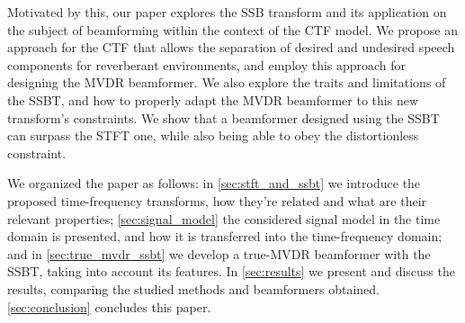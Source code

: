 Motivated by this, our paper explores the SSB transform and its application on the subject of beamforming within the context of the CTF model. We propose an approach for the CTF that allows the separation of desired and undesired speech components for reverberant environments, and employ this approach for designing the MVDR beamformer. We also explore the traits and limitations of the SSBT, and how to properly adapt the MVDR beamformer to this new transform's constraints. We show that a beamformer designed using the SSBT can surpass the STFT one, while also being able to obey the distortionless constraint.

We organized the paper as follows:
in \cref{sec:stft_and_ssbt} we introduce the proposed time-frequency transforms, how they're related and what are their relevant properties;
\cref{sec:signal_model} the considered signal model in the time domain is presented, and how it is transferred into the time-frequency domain;
and in \cref{sec:true_mvdr_ssbt} we develop a true-MVDR beamformer with the SSBT, taking into account its features.
In \cref{sec:results} we present and discuss the results, comparing the studied methods and beamformers obtained.
\cref{sec:conclusion} concludes this paper.